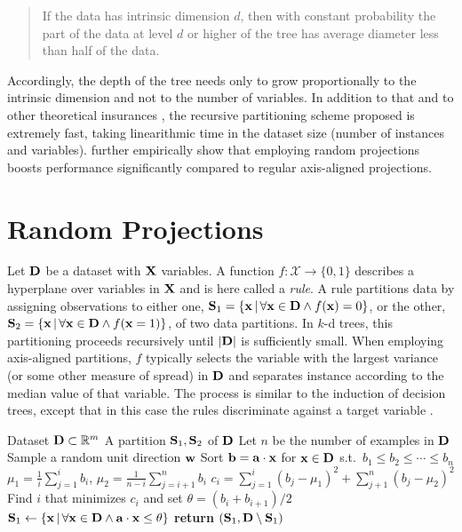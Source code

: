 \begin{quote}
  If the data has intrinsic dimension $d$, then with constant probability the part of the data at
  level $d$ or higher of the tree has average diameter less than half of the data.
\end{quote}

Accordingly, the depth of the tree needs only to grow proportionally to the intrinsic dimension and
not to the number of variables. In addition to that and to other theoretical insurances
\citep{dhesi10}, the recursive partitioning scheme proposed is extremely fast, taking linearithmic
time in the dataset size (number of instances and variables). \citet{dasgupta08a} further
empirically show that employing random projections boosts performance significantly compared to
regular axis-aligned projections.

\section{Random Projections}
\label{sec:rp}

Let $\mathbf{D}$ be a dataset with $\mathbf{X}$ variables. A function $f:\mathcal{X}\to\{0,1\}$ describes a
hyperplane over variables in $\mathbf{X}$ and is here called a \emph{rule}. A rule partitions data by
assigning observations to either one, $\mathbf{S}_1=\{\mathbf{x}\,|\,\forall\mathbf{x}\in\mathbf{D}\wedge
f(\mathbf{x})=0\}$, or the other, $\mathbf{S}_2=\{\mathbf{x}\,|\,\forall\mathbf{x}\in\mathbf{D}\wedge
f(\mathbf{x}=1)\}$, of two data partitions. In $k$-d trees, this partitioning proceeds recursively
until $|\mathbf{D}|$ is sufficiently small. When employing axis-aligned partitions, $f$ typically
selects the variable with the largest variance (or some other measure of spread) in $\mathbf{D}$ and
separates instance according to the median value of that variable. The process is similar to the
induction of decision trees, except that in this case the rules discriminate against a target
variable \citep{breiman01}.

\begin{algorithm}[t]
  \caption{}\label{alg:splitsid}
  \begin{algorithmic}[1]
    \Require Dataset $\mathbf{D}\subset\mathbb{R}^m$
    \Ensure A partition $\mathbf{S}_1,\mathbf{S}_2$ of $\mathbf{D}$
    \State Let $n$ be the number of examples in $\mathbf{D}$
    \State Sample a random unit direction $\mathbf{w}$
    \State Sort $\mathbf{b}=\mathbf{a}\cdot\mathbf{x}$ for $\mathbf{x}\in\mathbf{D}$ s.t.\ $b_1\leq b_2\leq\dotsb\leq b_n$
      \State $\mu_1 = \frac{1}{i}\sum_{j=1}^i b_i$, \; $\mu_2 = \frac{1}{n-i}\sum_{j=i+1}^n b_i$
      \State $c_i = \sum_{j=1}^i (b_j - \mu_1)^2 + \sum_{j+1}^n (b_j - \mu_2)^2$
    \EndFor
    \State Find $i$ that minimizes $c_i$ and set $\theta = (b_i + b_{i+1})/2$
    \State $\mathbf{S}_1 \gets \{\mathbf{x}\,|\,\forall\mathbf{x}\in\mathbf{D}\wedge\mathbf{a}\cdot\mathbf{x}\leq\theta\}$
    \State \textbf{return} $(\mathbf{S}_1,\mathbf{D} \setminus \mathbf{S}_1)$
  \end{algorithmic}
\end{algorithm}

